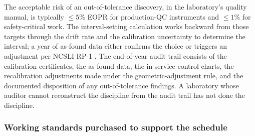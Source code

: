 The acceptable risk of an out-of-tolerance discovery, in the
laboratory's quality manual, is typically $\leq 5\%$ EOPR for
production-QC instruments and $\leq 1\%$ for safety-critical
work. The interval-setting calculation works backward from those
targets through the drift rate and the calibration uncertainty
to determine the interval; a year of as-found data either
confirms the choice or triggers an adjustment per NCSLI RP-1
\cite{web:ch03t3-ncsli-rp-1-2010}. The end-of-year audit
trail consists of the calibration certificates, the as-found
data, the in-service control charts, the recalibration adjustments
made under the geometric-adjustment rule, and the documented
disposition of any out-of-tolerance findings. A laboratory whose
auditor cannot reconstruct the discipline from the audit trail
has not done the discipline.

\subsubsection*{Working standards purchased to support the
schedule}

